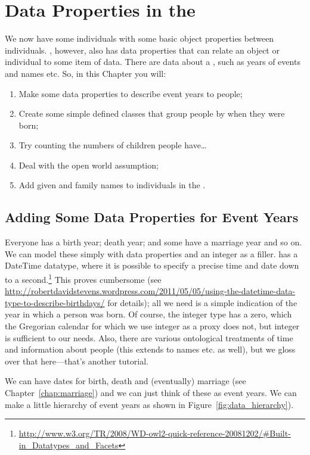 \chapter{Data Properties in the \fhkb}
\label{chap:data}
 
We now have some individuals with some basic object properties between individuals. \owlii, however, also has data properties that can relate an object or individual to some item of data. There are data about a \person, such as years of events and names etc. So, in this Chapter you will:
\begin{enumerate}
\item Make some data properties to describe event years to people;
\item Create some simple defined classes that group people by when they were born;
\item Try counting the numbers of children people have\ldots
\item Deal with the open world assumption;
\item Add given and family names to individuals in the \fhkb.
\end{enumerate}


\section{Adding Some Data Properties for Event Years}

Everyone has a birth year; death year; and some have a marriage year and so on. We can model these simply with data properties and an integer as a filler. \owlii has a DateTime datatype, where it is possible to specify a precise time and date down to a second.\footnote{\url{http://www.w3.org/TR/2008/WD-owl2-quick-reference-20081202/#Built-in_Datatypes_and_Facets}} This proves cumbersome (see \url{http://robertdavidstevens.wordpress.com/2011/05/05/using-the-datetime-data-type-to-describe-birthdays/} for details); all we need is a simple indication of the year in which a person was born. Of course, the integer type has a zero, which the Gregorian calendar for which we use integer as a proxy does not, but integer is sufficient to our needs. Also, there are various ontological treatments  of time and information about people (this extends to names etc. as well), but we gloss over that here---that's another tutorial.

We can have dates for birth, death and (eventually) marriage (see Chapter~\ref{chap:marriage}) and we can just think of these as event years. We can make a little hierarchy of event years as shown in Figure~\ref{fig:data_hierarchy}).

